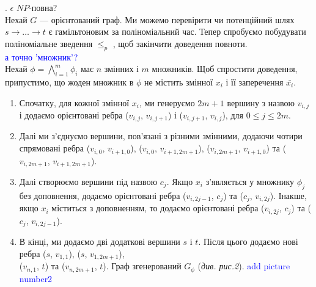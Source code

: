 \documentclass[14pt]{article}
\begin{document}
\begin{spacing}{1.175}
    . \dhampath \(\epsilon\) \(NP\)-повна?\\
    Нехай \(G\) — орієнтований граф. Ми можемо перевірити чи потенційний шлях \(s \to \dots \to t\) є гамільтоновим за поліноміальний час. Тепер спробуємо побудувати поліноміальне зведення \tsat \(\le_p\) \dhampath, щоб закінчити доведення повноти.
    \\
    \textcolor{blue}{а точно 'множник'?}\\
    Нехай \(\phi = \bigwedge_{i=1}^{m} \phi_{i}\) має \(n\) змінних і \(m\) множників. Щоб спростити доведення, припустимо, що жоден множник в \(\phi\) не містить змінної \(x_i\) і її заперечення \(\bar{x_i}\).  
    
    \begin{enumerate}
        \item  Спочатку, для кожної змінної \(x_i\), ми генеруємо \(2m+1\) вершину з назвою \(v_{i,j}\) і додаємо орієнтовані ребра (\(v_{i,j}\), \(v_{i,j+1}\)) і (\(v_{i,j+1}\), \(v_{i,j}\)), для \(0 \le j \le 2m\).
        
        \item  Далі ми з’єднуємо вершини, пов’язані з різними змінними, додаючи чотири спрямовані ребра (\(v_{i,0}\), \(v_{i+1,0}\)), (\(v_{i,0}\), \(v_{i+1,2m+1}\)), (\(v_{i,2m+1}\), \(v_{i+1,0}\)) та (\(v_{i,2m+1}\), \(v_{i+1,2m+1}\)).
        
        \item  Далі створюємо вершини під назвою \(c_{j}\). Якщо \(x_i\) з'являється у множнику \(\phi_{j}\) без доповнення, додаємо орієнтовані ребра
        (\(v_{i,2j-1}\), \(c_{j}\)) та (\(c_{j}\), \(v_{i,2j}\)). Інакше, якщо \(x_i\) міститься з доповненням, то додаємо орієнтовані ребра (\(v_{i,2j}\), \(c_{j}\)) та (\(c_{j}\), \(v_{i,2j-1}\)).
        
        \item В кінці, ми додаємо дві додаткові вершини \(s\) і \(t\). Після цього додаємо нові ребра (\(s\), \(v_{1,1}\)), (\(s\), \(v_{1,2m+1}\)), \\(\(v_{n,1}\), \(t\)) та (\(v_{n,2m+1}\), \(t\)). Граф згенерований \(G_{\phi}\) (\textit{див. рис.2}). \textcolor{blue}{add picture number2}        
    \end{enumerate}
    \\


\end{spacing}
\end{document}
